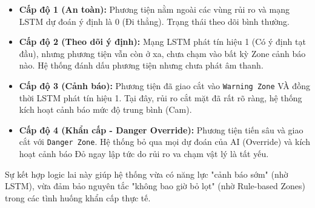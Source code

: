 	\begin{itemize}
		\item \textbf{Cấp độ 1 (An toàn):} Phương tiện nằm ngoài các vùng rủi ro và mạng LSTM dự đoán ý định là 0 (Đi thẳng). Trạng thái theo dõi bình thường.
		\item \textbf{Cấp độ 2 (Theo dõi ý định):} Mạng LSTM phát tín hiệu 1 (Có ý định tạt đầu), nhưng phương tiện vẫn còn ở xa, chưa chạm vào bất kỳ Zone cảnh báo nào. Hệ thống đánh dấu phương tiện nhưng chưa phát âm thanh.
		\item \textbf{Cấp độ 3 (Cảnh báo):} Phương tiện đã giao cắt vào \texttt{Warning Zone} VÀ đồng thời LSTM phát tín hiệu 1. Tại đây, rủi ro cắt mặt đã rất rõ ràng, hệ thống kích hoạt cảnh báo mức độ trung bình (Cam).
		\item \textbf{Cấp độ 4 (Khẩn cấp - Danger Override):} Phương tiện tiến sâu và giao cắt với \texttt{Danger Zone}. Hệ thống bỏ qua mọi dự đoán của AI (Override) và kích hoạt cảnh báo Đỏ ngay lập tức do rủi ro va chạm vật lý là tất yếu.
	\end{itemize}
	
	Sự kết hợp logic lai này giúp hệ thống vừa có năng lực "cảnh báo sớm" (nhờ LSTM), vừa đảm bảo nguyên tắc "không bao giờ bỏ lọt" (nhờ Rule-based Zones) trong các tình huống khẩn cấp thực tế.